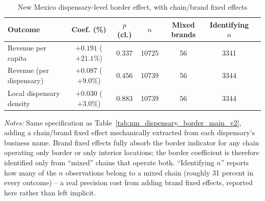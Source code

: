 \begin{table}[htbp]
\centering
\caption{New Mexico dispensary-level border effect, with chain/brand fixed effects}
\label{tab:nm_dispensary_border_brandfe}
\footnotesize
\begin{tabular}{lcccccc}
\toprule
Outcome & Coef. (\%) & $p$ (cl.) & $n$ & Mixed brands & Identifying $n$ \\
\midrule
Revenue per capita & $+0.191$ ($+21.1\%$) & 0.337 & 10725 & 56 & 3341 \\
Revenue (per dispensary) & $+0.087$ ($+9.0\%$) & 0.456 & 10739 & 56 & 3344 \\
Local dispensary density & $+0.030$ ($+3.0\%$) & 0.883 & 10739 & 56 & 3344 \\
\bottomrule
\end{tabular}
\begin{minipage}{0.98\textwidth}
\vspace{0.3em}
\footnotesize
\textit{Notes:} Same specification as Table~\ref{tab:nm_dispensary_border_main_v2}, adding a chain/brand fixed
effect mechanically extracted from each dispensary's business name. Brand fixed effects fully absorb the
border indicator for any chain operating only border or only interior locations; the border coefficient is
therefore identified only from ``mixed'' chains that operate both. ``Identifying $n$'' reports how many of the
$n$ observations belong to a mixed chain (roughly 31 percent in every outcome) -- a real precision cost from
adding brand fixed effects, reported here rather than left implicit.
\end{minipage}
\end{table}
